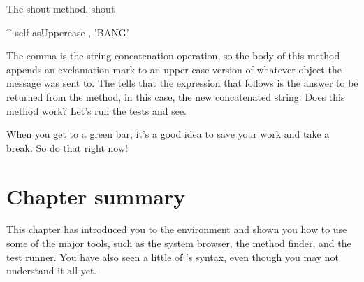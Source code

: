 \documentclass[a4paper,10pt,twoside]{book}
\begin{document}
\begin{method}[shout]{The shout method.}
shout

    ^ self asUppercase , 'BANG'
\end{method}

The comma is the string concatenation operation, so the body of this method appends an exclamation mark to an upper-case version of whatever  object the  message was sent to.
The \ct{^} tells \sq that the expression that follows is the answer to be returned from the method, in this case, the new concatenated string. 
Does this method work? Let's run the tests and see.


When you get to a green bar\footnotemark, it's a good idea to save your work and take a break.
So do that right now!

\section{Chapter summary}
This chapter has introduced you to the \sq environment and shown you how to use some of the major tools, such as the system browser, the method finder, and the test runner.
You have also seen a little of \sq's syntax, even though you may not understand it all yet.
\end{document}
